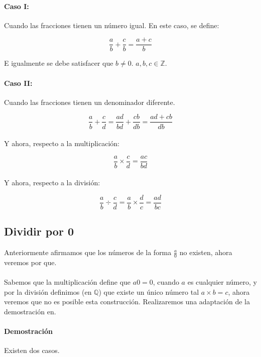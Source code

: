 \documentclass{article}
\begin{document}
\paragraph{Caso I:} Cuando las fracciones tienen un número igual. En este caso, se define:

$$\frac{a}{b} + \frac{c}{b} = \frac{a + c}{b}$$

E igualmente se debe satisfacer que $b \neq 0$. $a, b, c \in \mathbb{Z}$.

\paragraph{Caso II:} Cuando las fracciones tienen un denominador diferente.

$$\frac{a}{b} + \frac{c}{d} = \frac{ad}{bd} + \frac{cb}{db} = \frac{ad + cb}{db}$$

\paragraph{} Y ahora, respecto a la multiplicación:

$$\frac{a}{b} \times \frac{c}{d} = \frac{ac}{bd}$$

\paragraph{} Y ahora, respecto a la división:

$$\frac{a}{b} \div \frac{c}{d} = \frac{a}{b} \times \frac{d}{c} = \frac{ad}{bc}$$

\subsection{Dividir por 0}

Anteriormente afirmamos que los números de la forma $\frac{a}{0}$ no existen, ahora veremos por que.

\paragraph{}Sabemos que la multiplicación define que $a0 = 0$, cuando $a$ es cualquier número, y por la división definimos (en $\mathbb{Q}$) que existe un único número tal $a \times b = c$, ahora veremos que no es posible esta construcción. Realizaremos una adaptación de la demostración en\cite{brink_1933}.


\paragraph{Demostración} Existen dos casos.
\end{document}
